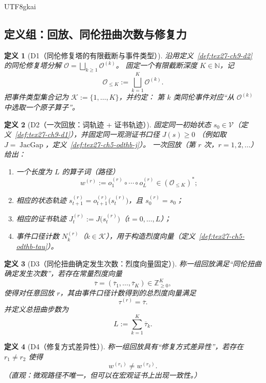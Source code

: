 \documentclass[12pt]{article}
\newtheorem{definition}{定义}[section]
\newcommand{\NN}{\mathbb{N}}
\newcommand{\ZZ}{\mathbb{Z}}
\newcommand{\JacGap}{\operatorname{JacGap}}
\begin{document}
\begin{CJK*}{UTF8}{gkai}
\subsection{定义组：回放、同伦扭曲次数与修复力}
\label{subsec:tex27-ch13-defs}

\begin{definition}[D1（同伦修复塔的有限截断与事件类型）]
\label{def:tex27-ch13-d1}
沿用定义~\ref{def:tex27-ch9-d2} 的同伦修复塔分解 $\mathcal{O}=\bigsqcup_{k\ge 1}\mathcal{O}^{(k)}$。
固定一个有限截断深度 $K\in\NN$，记
\[
  \mathcal{O}_{\le K}:=\bigsqcup_{k=1}^{K}\mathcal{O}^{(k)}.
\]
把事件类型集合记为 $\mathcal{K}:=\{1,\dots,K\}$，并约定：
第 $k$ 类同伦事件对应“从 $\mathcal{O}^{(k)}$ 中选取一个原子算子”。
\end{definition}

\begin{definition}[D2（一次回放：词轨迹 + 证书轨迹）]
\label{def:tex27-ch13-d2}
固定同一初始状态 $s_0\in\mathcal{V}$（定义~\ref{def:tex27-ch9-d1}），并固定同一观测证书口径 $J(s)\ge 0$
（例如取 $J=\JacGap$，定义~\ref{def:tex27-ch5-odthb-j}）。
一次回放（第 $r$ 次，$r=1,2,\dots$）给出：
\begin{enumerate}
  \item 一个长度为 $L$ 的算子词（路径）
  \[
    w^{(r)}:=o^{(r)}_1\circ\cdots\circ o^{(r)}_L\in (\mathcal{O}_{\le K})^{*};
  \]
  \item 相应的状态轨迹 $s^{(r)}_{t+1}=o^{(r)}_{t+1}\!\bigl(s^{(r)}_t\bigr)$，且 $s^{(r)}_0=s_0$；
  \item 相应的证书轨迹 $J^{(r)}_t:=J\!\bigl(s^{(r)}_t\bigr)$（$t=0,\dots,L$）；
  \item 事件口径计数 $N^{(r)}_k$（$k\in\mathcal{K}$），用于构造烈度向量（定义~\ref{def:tex27-ch5-odthb-tau}）。
\end{enumerate}
\end{definition}

\begin{definition}[D3（同伦扭曲确定发生次数：烈度向量固定）]
\label{def:tex27-ch13-d3}
称一组回放满足“同伦扭曲确定发生次数”，若存在常量烈度向量
\[
  \overline{\tau}=(\overline{\tau}_1,\dots,\overline{\tau}_K)\in\ZZ_{\ge 0}^{K},
\]
使得对任意回放 $r$，其由事件口径计数得到的总烈度向量满足
\[
  \tau^{(r)}=\overline{\tau}.
\]
并定义总扭曲步数为
\[
  L:=\sum_{k=1}^{K}\overline{\tau}_k.
\]
\end{definition}

\begin{definition}[D4（修复方式差异性）]
\label{def:tex27-ch13-d4}
称一组回放具有“修复方式差异性”，若存在 $r_1\neq r_2$ 使得
\[
  w^{(r_1)}\neq w^{(r_2)}.
\]
（直观：微观路径不唯一，但可以在宏观证书上出现一致性。）
\end{definition}


\end{CJK*}
\end{document}

